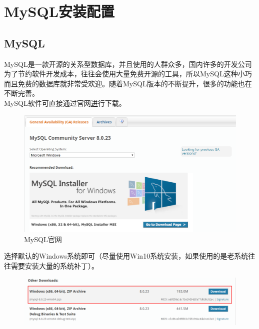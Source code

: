 \documentclass[12pt, openany, oneside]{book}
\begin{document}
\newpage

\chapter{MySQL安装配置}

\section{MySQL}

MySQL是一款开源的关系型数据库，并且使用的人群众多，国内许多的开发公司为了节约软件开发成本，往往会使用大量免费开源的工具，所以MySQL这种小巧而且免费的数据库就非常受欢迎。随着MySQL版本的不断提升，很多的功能也在不断完善。 \\

MySQL软件可直接通过官网\href{https://dev.mysql.com/downloads/mysql/8.0.html}进行下载。 \\

\begin{figure}[H]
    \centering
    \includegraphics[scale=0.5]{img/C2/1.png}
    \caption{MySQL官网}
\end{figure}

选择默认的Windows系统即可（尽量使用Win10系统安装，如果使用的是老系统往往需要安装大量的系统补丁）。 \\

\begin{figure}[H]
    \centering
    \includegraphics[scale=0.5]{img/C2/2.png}
\end{figure}
\end{document}
